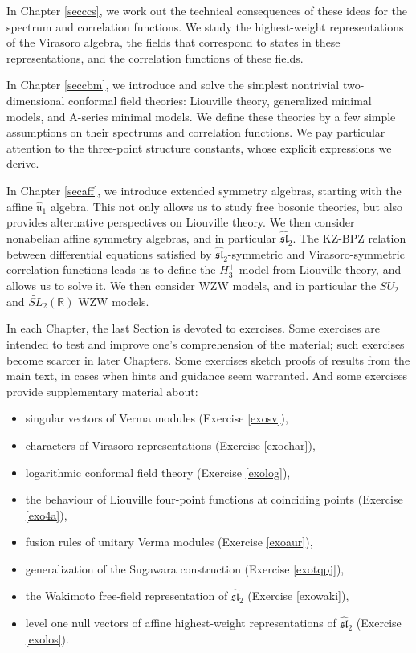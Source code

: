 \documentclass[12pt, a4paper, notitlepage, twoside]{report}
\numberwithin{equation}{section}
\theoremstyle{break}
\begin{document}
In Chapter \ref{secccs}, we work out the technical consequences of these ideas for the spectrum and correlation functions.
We study the highest-weight representations of the Virasoro algebra, the fields that correspond to states in these representations, and the correlation functions of these fields. 

In Chapter \ref{seccbm}, we introduce and solve the simplest nontrivial two-dimensional conformal field theories: Liouville theory, generalized minimal models, and A-series minimal models.
We define these theories by a few simple assumptions on their spectrums and correlation functions.
We pay particular attention to the three-point structure constants, whose explicit expressions we derive. 

In Chapter \ref{secaff}, we introduce extended symmetry algebras, starting with the affine $\hat{\mathfrak{u}}_1$ algebra.
This not only allows us to study free bosonic theories, but also provides alternative perspectives on Liouville theory.
We then consider nonabelian affine symmetry algebras, and in particular $\widehat{\mathfrak{sl}}_2$.
The KZ-BPZ relation between differential equations satisfied by $\widehat{\mathfrak{sl}}_2$-symmetric and Virasoro-symmetric correlation functions leads us to define the $H_3^+$ model from Liouville theory, and allows us to solve it.
We then consider WZW models, and in particular the $SU_2$ and $\widetilde{SL}_2(\mathbb{R})$ WZW models. 

In each Chapter, the last Section is devoted to exercises.
Some exercises are intended to test and improve one's comprehension of the material; such exercises become scarcer in later Chapters.
Some exercises sketch proofs of results from the main text, in cases when hints and guidance seem warranted.
And some exercises provide supplementary material about: 
\begin{itemize}
 \item singular vectors of Verma modules (Exercise \ref{exosv}),
 \item characters of Virasoro representations (Exercise \ref{exochar}),
\item logarithmic conformal field theory (Exercise \ref{exolog}), 
\item the behaviour of Liouville four-point functions at coinciding points (Exercise \ref{exo4a}),
\item fusion rules of unitary Verma modules (Exercise \ref{exoaur}), 
\item generalization of the Sugawara construction (Exercise \ref{exotqpj}),
\item the Wakimoto free-field representation of $\widehat{\mathfrak{sl}}_2$ (Exercise \ref{exowaki}),
\item level one null vectors of affine highest-weight representations of $\widehat{\mathfrak{sl}}_2$ (Exercise \ref{exolos}).
\end{itemize}
\end{document}
